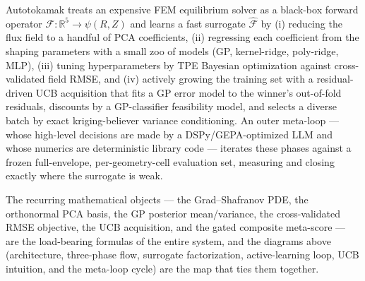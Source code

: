 \documentclass[11pt]{article}
\newcommand{\Ffwd}{\mathcal{F}}
\newcommand{\Fhat}{\hat{\mathcal{F}}}
\newcommand{\R}{\mathbb{R}}
\begin{document}
Autotokamak treats an expensive FEM equilibrium solver as a black-box forward operator
$\Ffwd:\R^5\to\psi(R,Z)$ and learns a fast surrogate $\Fhat$ by (i) reducing the flux field to a
handful of PCA coefficients, (ii) regressing each coefficient from the shaping parameters with a
small zoo of models (GP, kernel-ridge, poly-ridge, MLP), (iii) tuning hyperparameters by TPE
Bayesian optimization against cross-validated field RMSE, and (iv) actively growing the training
set with a residual-driven UCB acquisition that fits a GP error model to the winner's out-of-fold
residuals, discounts by a GP-classifier feasibility model, and selects a diverse batch by exact
kriging-believer variance conditioning. An outer meta-loop --- whose high-level decisions are made
by a DSPy/GEPA-optimized LLM and whose numerics are deterministic library code --- iterates these
phases against a frozen full-envelope, per-geometry-cell evaluation set, measuring and closing
exactly where the surrogate is weak.

The recurring mathematical objects --- the Grad--Shafranov PDE, the orthonormal PCA basis, the GP
posterior mean/variance, the cross-validated RMSE objective, the UCB acquisition, and the gated
composite meta-score --- are the load-bearing formulas of the entire system, and the diagrams above
(architecture, three-phase flow, surrogate factorization, active-learning loop, UCB intuition, and
the meta-loop cycle) are the map that ties them together.
\end{document}
